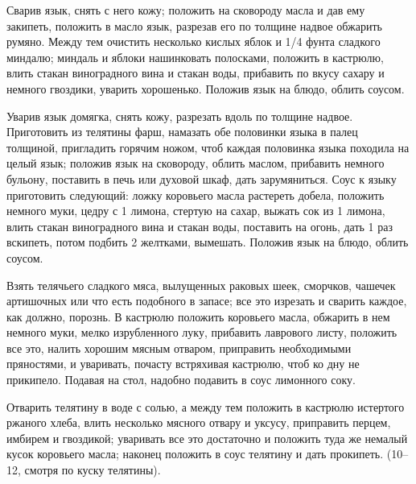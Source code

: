 
Сварив язык, снять с него кожу; положить на сковороду масла и дав ему закипеть, положить в масло язык, разрезав его по толщине надвое обжарить румяно. Между тем очистить несколько кислых яблок и 1/4 фунта сладкого миндалю; миндаль и яблоки нашинковать полосками, положить в кастрюлю, влить стакан виноградного вина и стакан воды, прибавить по вкусу сахару и немного гвоздики, уварить хорошенько. Положив язык на блюдо, облить соусом. 


Уварив язык домягка, снять кожу, разрезать вдоль по толщине надвое. Приготовить из телятины фарш, намазать обе половинки языка в палец толщиной, пригладить горячим ножом, чтоб каждая половинка языка походила на целый язык; положив язык на сковороду, облить маслом, прибавить немного бульону, поставить в печь или духовой шкаф, дать зарумяниться. Соус к языку приготовить следующий: ложку коровьего масла растереть добела, положить немного муки, цедру с 1 лимона, стертую на сахар, выжать сок из 1 лимона, влить стакан виноградного вина и стакан воды, поставить на огонь, дать 1 раз вскипеть, потом подбить 2 желтками, вымешать. Положив язык на блюдо, облить соусом. 


Взять телячьего сладкого мяса, вылущенных раковых шеек, сморчков, чашечек артишочных или что есть подобного в запасе; все это изрезать и сварить каждое, как должно, порознь. В кастрюлю положить коровьего масла, обжарить в нем немного муки, мелко изрубленного луку, прибавить лаврового листу, положить все это, налить хорошим мясным отваром, приправить необходимыми пряностями, и уваривать, почасту встряхивая кастрюлю, чтоб ко дну не прикипело. Подавая на стол, надобно подавить в соус лимонного соку. 


Отварить телятину в воде с солью, а между тем положить в кастрюлю истертого ржаного хлеба, влить несколько мясного отвару и уксусу, приправить перцем, имбирем и гвоздикой; уваривать все это достаточно и положить туда же немалый кусок коровьего масла; наконец положить в соус телятину и дать прокипеть. (10--12, смотря по куску телятины). 



